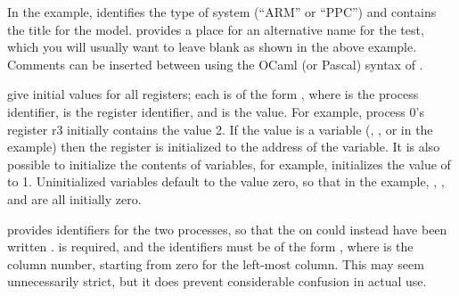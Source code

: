 \begin{fcvref}
In the example,  identifies the type of system (``ARM'' or
``PPC'') and contains the title for the model. 
provides a place for an
alternative name for the test, which you will usually want to leave
blank as shown in the above example. Comments can be inserted between
 using the OCaml (or Pascal) syntax of \nbco{(* *)}.

 give initial values for all registers;
each is of the form
, where  is the process identifier,  is the register
identifier, and  is the value. For example, process 0's register
r3 initially contains the value 2. If the value is a variable (,
, or  in the example) then the register is initialized to the
address of the variable. It is also possible to initialize the contents
of variables, for example,  initializes the value of  to
1. Uninitialized variables default to the value zero, so that in the
example, , , and  are all initially zero.

 provides identifiers for the two processes, so that
the  on  could instead have been written
.  is
required, and the identifiers must be of the form , where 
is the column number, starting from zero for the left-most column. This
may seem unnecessarily strict, but it does prevent considerable confusion
in actual use.
\end{fcvref}

\QuickQuizEnd

